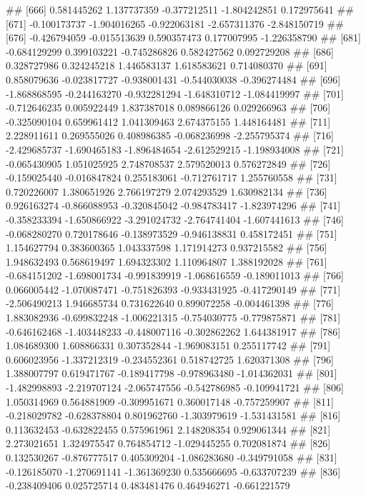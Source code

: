 \documentclass[
]{article}
\begin{document}
\begin{enumerate}[label=(\alph*)]
##  [666]  0.581445262  1.137737359 -0.377212511 -1.804242851  0.172975641
##  [671] -0.100173737 -1.904016265 -0.922063181 -2.657311376 -2.848150719
##  [676] -0.426794059 -0.015513639  0.590357473  0.177007995 -1.226358790
##  [681] -0.684129299  0.399103221 -0.745286826  0.582427562  0.092729208
##  [686]  0.328727986  0.324245218  1.446583137  1.618583621  0.714080370
##  [691]  0.858079636 -0.023817727 -0.938001431 -0.544030038 -0.396274484
##  [696] -1.868868595 -0.244163270 -0.932281294 -1.648310712 -1.084419997
##  [701] -0.712646235  0.005922449  1.837387018  0.089866126  0.029266963
##  [706] -0.325090104  0.659961412  1.041309463  2.674375155  1.448164481
##  [711]  2.228911611  0.269555026  0.408986385 -0.068236998 -2.255795374
##  [716] -2.429685737 -1.690465183 -1.896484654 -2.612529215 -1.198934008
##  [721] -0.065430905  1.051025925  2.748708537  2.579520013  0.576272849
##  [726] -0.159025440 -0.016847824  0.255183061 -0.712761717  1.255760558
##  [731]  0.720226007  1.380651926  2.766197279  2.074293529  1.630982134
##  [736]  0.926163274 -0.866088953 -0.320845042 -0.984783417 -1.823974296
##  [741] -0.358233394 -1.650866922 -3.291024732 -2.764741404 -1.607441613
##  [746] -0.068280270  0.720178646 -0.138973529 -0.946138831  0.458172451
##  [751]  1.154627794  0.383600365  1.043337598  1.171914273  0.937215582
##  [756]  1.948632493  0.568619497  1.694323302  1.110964807  1.388192028
##  [761] -0.684151202 -1.698001734 -0.991839919 -1.068616559 -0.189011013
##  [766]  0.066005442 -1.070087471 -0.751826393 -0.933431925 -0.417290149
##  [771] -2.506490213  1.946685734  0.731622640  0.899072258 -0.004461398
##  [776]  1.883082936 -0.699832248 -1.006221315 -0.754030775 -0.779875871
##  [781] -0.646162468 -1.403448233 -0.448007116 -0.302862262  1.644381917
##  [786]  1.084689300  1.608866331  0.307352844 -1.969083151  0.255117742
##  [791]  0.606023956 -1.337212319 -0.234552361  0.518742725  1.620371308
##  [796]  1.388007797  0.619471767 -0.189417798 -0.978963480 -1.014362031
##  [801] -1.482998893 -2.219707124 -2.065747556 -0.542786985 -0.109941721
##  [806]  1.050314969  0.564881909 -0.309951671  0.360017148 -0.757259907
##  [811] -0.218029782 -0.628378804  0.801962760 -1.303979619 -1.531431581
##  [816]  0.113632453 -0.632822455  0.575961961  2.148208354  0.929061344
##  [821]  2.273021651  1.324975547  0.764854712 -1.029445255  0.702081874
##  [826]  0.132530267 -0.876777517  0.405309204 -1.086283680 -0.349791058
##  [831] -0.126185070 -1.270691141 -1.361369230  0.535666695 -0.633707239
##  [836] -0.238409406  0.025725714  0.483481476  0.464946271 -0.661221579

\end{enumerate}
\end{document}
